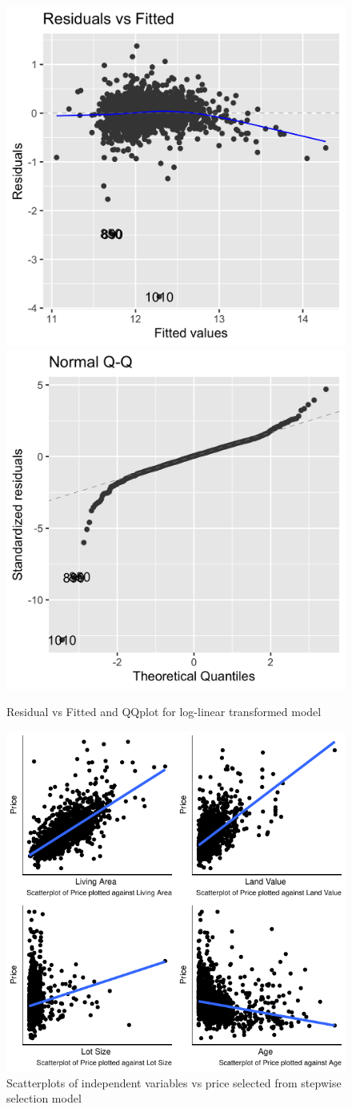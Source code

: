 \documentclass[letterpaper,8pt,twocolumn,twoside,]{pinp}
\begin{document}
\begin{figure}[h]

{\centering \includegraphics[width=0.49\linewidth]{plot5} \includegraphics[width=0.49\linewidth]{plot6} 

}

\caption{Residual vs Fitted and QQplot for log-linear transformed model}\label{fig:unnamed-chunk-7}
\end{figure}

\begin{figure}[h]

{\centering \includegraphics[width=0.75\linewidth]{Report_files/figure-latex/unnamed-chunk-8-1} 

}

\caption{Scatterplots of independent variables vs price selected from stepwise selection model}\label{fig:unnamed-chunk-8}
\end{figure}
\end{document}
